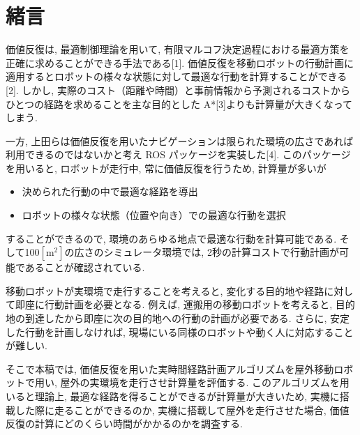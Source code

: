\documentclass{jarticle}
\begin{document}
\small
\section{緒言}%
価値反復は, 最適制御理論を用いて, 有限マルコフ決定過程における最適方策を正確に求めることができる手法である[1].
価値反復を移動ロボットの行動計画に適用するとロボットの様々な状態に対して最適な行動を計算することができる[2].
しかし, 実際のコスト（距離や時間）と事前情報から予測されるコストからひとつの経路を求めることを主な目的とした A*[3]よりも計算量が大きくなってしまう.

一方, 上田らは価値反復を用いたナビゲーションは限られた環境の広さであれば利用できるのではないかと考え ROS パッケージを実装した[4].
このパッケージを用いると, ロボットが走行中, 常に価値反復を行うため, 計算量が多いが
\begin{itemize}
	\item 決められた行動の中で最適な経路を導出
	\item ロボットの様々な状態（位置や向き）での最適な行動を選択
 \end{itemize}
することができるので, 環境のあらゆる地点で最適な行動を計算可能である. そして100$\mathrm{[m^2]}$の広さのシミュレータ環境では, 2秒の計算コストで行動計画が可能であることが確認されている.

移動ロボットが実環境で走行することを考えると, 変化する目的地や経路に対して即座に行動計画を必要となる.
例えば, 運搬用の移動ロボットを考えると, 目的地の到達したから即座に次の目的地への行動の計画が必要である.
さらに, 安定した行動を計画しなければ, 現場にいる同様のロボットや動く人に対応することが難しい.

そこで本稿では, 価値反復を用いた実時間経路計画アルゴリズムを屋外移動ロボットで用い, 屋外の実環境を走行させ計算量を評価する.
このアルゴリズムを用いると理論上, 最適な経路を得ることができるが計算量が大きいため, 実機に搭載した際に走ることができるのか, 実機に搭載して屋外を走行させた場合, 価値反復の計算にどのくらい時間がかかるのかを調査する.



\end{document}
